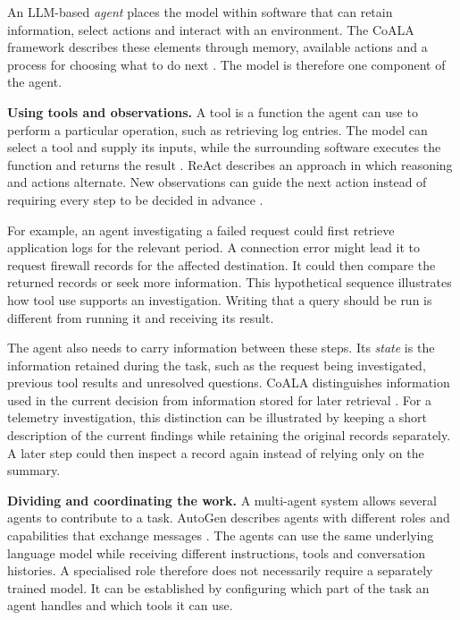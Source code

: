 An LLM-based \emph{agent} places the model within software that can retain
information, select actions and interact with an environment. The CoALA
framework describes these elements through memory, available actions and
a process for choosing what to do next
\parencite{sumers2024coala}. The model is therefore one component of the
agent.

\noindent\textbf{Using tools and observations.} A tool is a function the
agent can use to perform a particular operation, such as retrieving log
entries. The model can select a tool and supply its inputs, while the
surrounding software executes the function and returns the result
\parencite{sumers2024coala}. ReAct describes an approach in which reasoning
and actions alternate. New observations can guide the next action instead
of requiring every step to be decided in advance
\parencite{yao2023react}.

For example, an agent investigating a failed request could first retrieve
application logs for the relevant period. A connection error might lead it
to request firewall records for the affected destination. It could then
compare the returned records or seek more information. This hypothetical
sequence illustrates how tool use supports an investigation. Writing that
a query should be run is different from running it and receiving its
result.

The agent also needs to carry information between these steps. Its
\emph{state} is the information retained during the task, such as the
request being investigated, previous tool results and unresolved questions.
CoALA distinguishes information used in the current decision from
information stored for later retrieval
\parencite{sumers2024coala}. For a telemetry investigation, this distinction
can be illustrated by keeping a short description of the current findings
while retaining the original records separately. A later step could then
inspect a record again instead of relying only on the summary.

\noindent\textbf{Dividing and coordinating the work.} A multi-agent system
allows several agents to contribute to a task. AutoGen describes agents
with different roles and capabilities that exchange messages
\parencite{wu2023autogen}. The agents can use the same underlying language
model while receiving different instructions, tools and conversation
histories. A specialised role therefore does not necessarily require a
separately trained model. It can be established by configuring which part
of the task an agent handles and which tools it can use.


